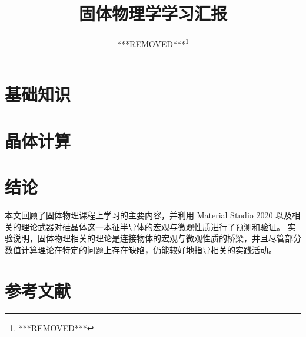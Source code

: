 \documentclass{ctexart}
\title{固体物理学学习汇报}
\author{***REMOVED***\thanks{***REMOVED***}}
\numberwithin{equation}{subsection}
\theoremstyle{definition}
\begin{document}
\maketitle
\tableofcontents
\clearpage

\section{基础知识}


\section{晶体计算}


\section{结论}
本文回顾了固体物理课程上学习的主要内容，并利用 Material Studio 2020 以及相关的理论武器对硅晶体这一本征半导体的宏观与微观性质进行了预测和验证。
实验说明，固体物理相关的理论是连接物体的宏观与微观性质的桥梁，并且尽管部分数值计算理论在特定的问题上存在缺陷，仍能较好地指导相关的实践活动。

\section{参考文献}
\nocite{*}
\printbibliography[heading=none]
\end{document}
